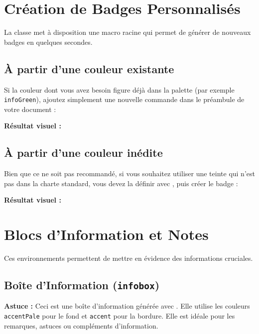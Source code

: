 \section{Création de Badges Personnalisés}

La classe met à disposition une macro racine  qui permet de générer de nouveaux badges en quelques secondes.

\subsection{À partir d'une couleur existante}
Si la couleur dont vous avez besoin figure déjà dans la palette (par exemple \texttt{infoGreen}), ajoutez simplement une nouvelle commande dans le préambule de votre document :

\begin{texblock}
\newcommand{\badgeNouveau}{\badge[infoGreen]{Nouveau}}
\end{texblock}

\textbf{Résultat visuel :} \badgeNouveau

\subsection{À partir d'une couleur inédite}
Bien que ce ne soit pas recommandé, si vous souhaitez utiliser une teinte qui n'est pas dans la charte standard, vous devez la définir avec , puis créer le badge :

\begin{texblock}

\newcommand{\badgePerso}{\badge[customPurple]{Spécial}}
\end{texblock}

\textbf{Résultat visuel :} \badgePerso


\section{Blocs d'Information et Notes}

Ces environnements permettent de mettre en évidence des informations cruciales.

\subsection{Boîte d'Information (\texttt{infobox})}
\begin{infobox}
    \textbf{Astuce :} Ceci est une boîte d'information générée avec . Elle utilise les couleurs \texttt{accentPale} pour le fond et \texttt{accent} pour la bordure. Elle est idéale pour les remarques, astuces ou compléments d'information.
\end{infobox}

